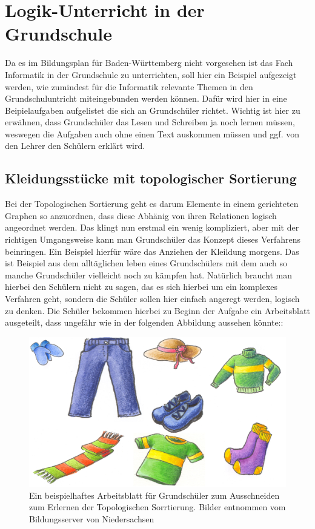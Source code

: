 \section{Logik-Unterricht in der Grundschule}
Da es im Bildungsplan für Baden-Württemberg nicht vorgesehen ist das Fach Informatik in der Grundschule zu unterrichten, soll hier ein Beispiel aufgezeigt werden, wie zumindest für die Informatik relevante  Themen in den Grundschuluntricht miteingebunden werden können. Dafür wird hier in eine Beipielaufgaben aufgelistet die sich an Grundschüler richtet. Wichtig ist hier zu erwähnen, dass Grundschüler das Lesen und Schreiben ja noch lernen müssen, weswegen die Aufgaben auch ohne einen Text auskommen müssen und ggf. von den Lehrer den Schülern erklärt wird.

\subsection{Kleidungsstücke mit topologischer Sortierung}

Bei der Topologischen Sortierung geht es darum Elemente in einem gerichteten Graphen so anzuordnen, dass diese Abhänig von ihren Relationen logisch angeordnet werden. Das klingt nun erstmal ein wenig kompliziert, aber mit der richtigen Umgangsweise kann man Grundschüler das Konzept dieses Verfahrens beinringen. Ein Beispiel hierfür wäre das Anziehen der Kleildung morgens. Das ist Beispiel aus dem alltäglichen leben eines Grundschülers mit dem auch so manche Grundschüler vielleicht noch zu kämpfen hat. Natürlich braucht man hierbei den Schülern nicht zu sagen, das es sich hierbei um ein komplexes Verfahren geht, sondern die Schüler sollen hier einfach angeregt werden, logisch zu denken. Die Schüler bekommen hierbei zu Beginn der Aufgabe ein Arbeitsblatt ausgeteilt, dass ungefähr wie in der folgenden Abbildung aussehen könnte::

\begin{figure}[H]
	\centering
	\includegraphics[width=\textwidth,height=\textheight,keepaspectratio]{images/Kleidersammlung.png}
	\caption{Ein beispielhaftes Arbeitsblatt für Grundschüler zum Ausschneiden zum Erlernen der Topologischen Sorrtierung. Bilder entnommen vom Bildungsserver von Niedersachsen \cite{Kleidung}}
	\label{Beispielaufgabe anziehen}
\end{figure}

